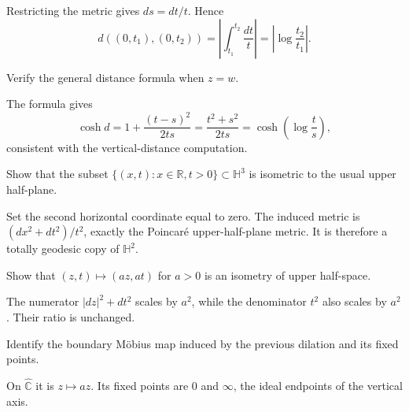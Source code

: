 \begin{solution}
Restricting the metric gives \(ds=dt/t\).  Hence
\[
d((0,t_1),(0,t_2))=\left|\int_{t_1}^{t_2}\frac{dt}{t}\right|=\left|\log\frac{t_2}{t_1}\right|.
\]
\end{solution}

\begin{problem}\label{prob:vii36-02}
Verify the general distance formula when \(z=w\).
\end{problem}

\begin{solution}
The formula gives
\[
\cosh d=1+\frac{(t-s)^2}{2ts}=\frac{t^2+s^2}{2ts}=\cosh\left(\log\frac ts\right),
\]
consistent with the vertical-distance computation.
\end{solution}

\begin{problem}\label{prob:vii36-03}
Show that the subset \(\{(x,t):x\in\mathbb R,t>0\}\subset\mathbb H^3\) is isometric to the usual upper half-plane.
\end{problem}

\begin{solution}
Set the second horizontal coordinate equal to zero.  The induced metric is \((dx^2+dt^2)/t^2\), exactly the Poincaré upper-half-plane metric.  It is therefore a totally geodesic copy of \(\mathbb H^2\).
\end{solution}

\begin{problem}\label{prob:vii36-04}
Show that \((z,t)\mapsto(az,at)\) for \(a>0\) is an isometry of upper half-space.
\end{problem}

\begin{solution}
The numerator \(|dz|^2+dt^2\) scales by \(a^2\), while the denominator \(t^2\) also scales by \(a^2\).  Their ratio is unchanged.
\end{solution}

\begin{problem}\label{prob:vii36-05}
Identify the boundary Möbius map induced by the previous dilation and its fixed points.
\end{problem}

\begin{solution}
On \(\widehat{\mathbb C}\) it is \(z\mapsto az\).  Its fixed points are \(0\) and \(\infty\), the ideal endpoints of the vertical axis.
\end{solution}


